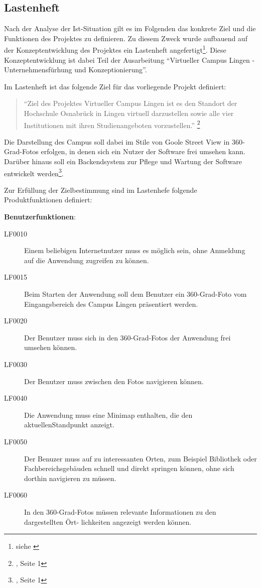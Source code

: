 \subsection{Lastenheft}
\label{sec:Lastenheft}

Nach der Analyse der Ist-Situation gilt es im Folgenden das konkrete Ziel und die Funktionen des Projektes zu definieren. 
Zu diesem Zweck wurde aufbauend auf der Konzeptentwicklung des Projektes ein Lastenheft angefertigt\footnote{siehe \citet{lastenheft2013}}.
Diese Konzeptentwicklung ist dabei Teil der Ausarbeitung "`Virtueller Campus Lingen - Unternehmensfürhung und Konzeptionierung"'.

Im Lastenheft ist das folgende Ziel für das vorliegende Projekt definiert:

\begin{quote}
"`Ziel des Projektes Virtueller Campus Lingen ist es den Standort der Hochschule Osnabrück
in Lingen virtuell darzustellen sowie alle vier Institutionen mit ihren Studienangeboten
vorzustellen."' \footnote{\citet{lastenheft2013}, Seite 1}
\end{quote}

Die Darstellung des Campus soll dabei im Stile von Goole Street View in 360-Grad-Fotos erfolgen, in 
denen sich ein Nutzer der Software frei umsehen kann. Darüber hinaus soll ein Backendsystem zur Pflege und Wartung der 
Software entwickelt werden\footnote{\citet{lastenheft2013}, Seite 1}.

Zur Erfüllung der Zielbestimmung sind im Lastenhefe folgende Produktfunktionen definiert:

\textbf{Benutzerfunktionen}:

\begin{description}
  \item[LF0010] Einem beliebigen Internetnutzer muss es möglich sein, ohne Anmeldung auf die
  Anwendung zugreifen zu können.
  \item[LF0015] Beim Starten der Anwendung soll dem Benutzer ein 360-Grad-Foto vom
  Eingangsbereich des Campus Lingen präsentiert werden.
  \item[LF0020] Der Benutzer muss sich in den 360-Grad-Fotos der Anwendung frei umsehen
  können.
  \item[LF0030] Der Benutzer muss zwischen den Fotos navigieren können.
  \item[LF0040] Die Anwendung muss eine Minimap enthalten, die den aktuellenStandpunkt anzeigt.
  \item[LF0050] Der Benuzer muss auf zu interessanten Orten, zum Beispiel Bibliothek oder Fachbereichsgebäuden schnell und direkt springen können, ohne sich dorthin navigieren zu müssen.
  \item[LF0060] In den 360-Grad-Fotos müssen relevante Informationen zu den dargestellten Ört-
  lichkeiten angezeigt werden können.
\end{description}

